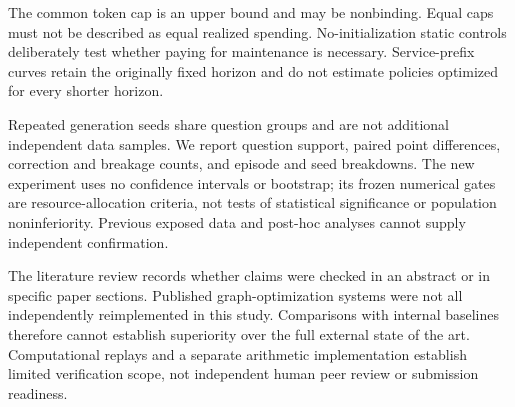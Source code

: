 The common token cap is an upper bound and may be nonbinding. Equal caps
must not be described as equal realized spending. No-initialization static
controls deliberately test whether paying for maintenance is necessary.
Service-prefix curves retain the originally fixed horizon and do not
estimate policies optimized for every shorter horizon.

Repeated generation seeds share question groups and are not additional
independent data samples. We report question support, paired point
differences, correction and breakage counts, and episode and seed
breakdowns. The new experiment uses no confidence intervals or bootstrap;
its frozen numerical gates are resource-allocation criteria, not tests of
statistical significance or population noninferiority. Previous exposed
data and post-hoc analyses cannot supply independent confirmation.

The literature review records whether claims were checked in an abstract
or in specific paper sections. Published graph-optimization systems were
not all independently reimplemented in this study. Comparisons with
internal baselines therefore cannot establish superiority over the full
external state of the art. Computational replays and a separate arithmetic
implementation establish limited verification scope, not independent
human peer review or submission readiness.
